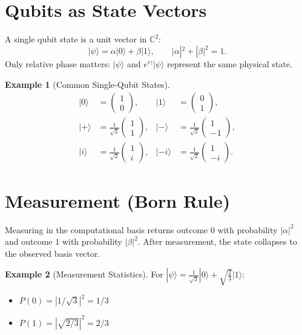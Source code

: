 \documentclass[11pt, a4paper, openany]{book}
\theoremstyle{definition}
\newtheorem{example}{Example}[chapter]
\begin{document}
\section{Qubits as State Vectors}
A single qubit state is a unit vector in $\mathbb{C}^2$:
\begin{equation}
|\psi\rangle = \alpha|0\rangle + \beta|1\rangle,\qquad |\alpha|^2 + |\beta|^2 = 1.
\end{equation}
Only relative phase matters: $|\psi\rangle$ and $e^{i\gamma}|\psi\rangle$ represent the same physical state.

\begin{example}[Common Single-Qubit States]
\begin{align}
|0\rangle &= \begin{pmatrix} 1 \\ 0 \end{pmatrix}, &
|1\rangle &= \begin{pmatrix} 0 \\ 1 \end{pmatrix}, \\
|+\rangle &= \frac{1}{\sqrt{2}}\begin{pmatrix} 1 \\ 1 \end{pmatrix}, &
|-\rangle &= \frac{1}{\sqrt{2}}\begin{pmatrix} 1 \\ -1 \end{pmatrix}, \\
|i\rangle &= \frac{1}{\sqrt{2}}\begin{pmatrix} 1 \\ i \end{pmatrix}, &
|-i\rangle &= \frac{1}{\sqrt{2}}\begin{pmatrix} 1 \\ -i \end{pmatrix}.
\end{align}
\end{example}

\section{Measurement (Born Rule)}
Measuring in the computational basis returns outcome $0$ with probability $|\alpha|^2$ and outcome $1$ with probability $|\beta|^2$. After measurement, the state collapses to the observed basis vector.

\begin{example}[Measurement Statistics]
For $|\psi\rangle = \frac{1}{\sqrt{3}}|0\rangle + \sqrt{\frac{2}{3}}|1\rangle$:
\begin{itemize}
    \item $P(0) = |1/\sqrt{3}|^2 = 1/3$
    \item $P(1) = |\sqrt{2/3}|^2 = 2/3$
\end{itemize}
\end{example}
\end{document}
